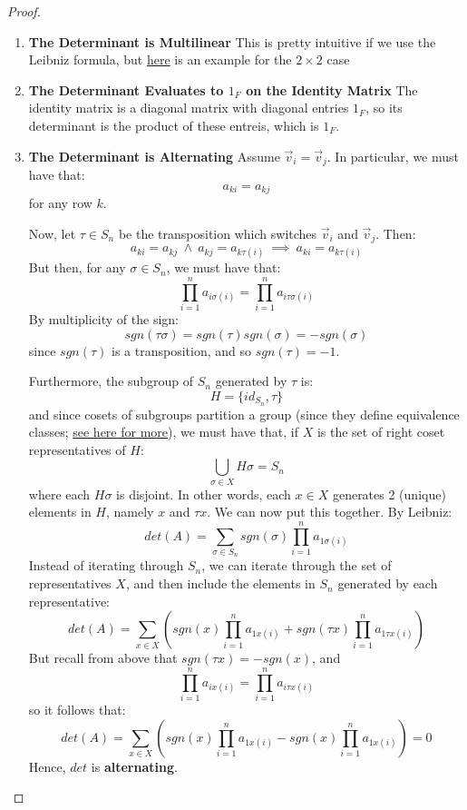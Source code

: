 \documentclass{exam}
\begin{document}
\begin{proof}

\begin{enumerate}
    \item \textbf{The Determinant is Multilinear}
    This is pretty intuitive if we use the Leibniz formula, but \href{https://math.stackexchange.com/questions/1403735/why-is-determinant-a-multilinear-function}{here} is an example for the $2 \times 2$ case
    \item \textbf{The Determinant Evaluates to $1_F$ on the Identity Matrix}
    The identity matrix is a diagonal matrix with diagonal entries $1_F$, so its determinant is the product of these entreis, which is $1_F$.
    \item \textbf{The Determinant is Alternating}
    Assume $\vec{v}_i = \vec{v}_j$. In particular, we must have that:
    \[
    a_{ki} = a_{kj}
    \]
    for any row $k$.
    
    \bigskip
    
    Now, let $\tau \in S_n$ be the transposition which switches $\vec{v}_i$ and $\vec{v}_j$. Then:
    \[
    a_{ki} = a_{kj} \ \wedge \ a_{kj} = a_{k\tau(i)} \ \implies \ a_{ki} = a_{k\tau(i)}
    \]
    But then, for any $\sigma \in S_n$, we must have that:
    \[
    \prod_{i = 1}^n a_{i\sigma(i)} = \prod_{i = 1}^n a_{i\tau \sigma(i)}
    \]
    By multiplicity of the sign:
    \[
    sgn(\tau \sigma) = sgn(\tau)sgn(\sigma) = -sgn(\sigma)
    \]
    since $sgn(\tau)$ is a transposition, and so $sgn(\tau) = -1$.
    
    \bigskip
    
    Furthermore, the subgroup of $S_n$ generated by $\tau$ is:
    \[
    H = \{id_{S_n}, \tau\}
    \]
    and since cosets of subgroups partition a group (since they define equivalence classes; \href{https://groupprops.subwiki.org/wiki/Left_cosets_partition_a_group}{see here for more}), we must have that, if $X$ is the set of right coset representatives of $H$:
    \[
    \bigcup_{\sigma \in X} H\sigma = S_n
    \]
    where each $H\sigma$ is disjoint. In other words, each $x \in X$ generates 2 (unique) elements in $H$, namely $x$ and $\tau x$.
    \bigskip
    We can now put this together. By Leibniz:
    \[
    det(A) = \sum_{\sigma \in S_n} sgn(\sigma)\prod_{i = 1}^n a_{1\sigma(i)}
    \]
    Instead of iterating through $S_n$, we can iterate through the set of representatives $X$, and then include the elements in $S_n$ generated by each representative:
    \[
    det(A) = \sum_{x \in X} \left(sgn(x)\prod_{i = 1}^n a_{1x(i)} + sgn(\tau x) \prod_{i = 1}^n a_{1\tau x(i)}\right)
    \]
    But recall from above that $sgn(\tau x) = -sgn(x)$, and
    \[
    \prod_{i = 1}^n a_{ix(i)} = \prod_{i = 1}^n a_{i\tau x(i)}
    \]
    so it follows that:
    \[
    det(A) = \sum_{x \in X} \left(sgn(x)\prod_{i = 1}^n a_{1x(i)} - sgn(x) \prod_{i = 1}^n a_{1x(i)}\right) = 0
    \]
    Hence, $det$ is \textbf{alternating}.
    

\end{enumerate}
\end{proof}
\end{document}
